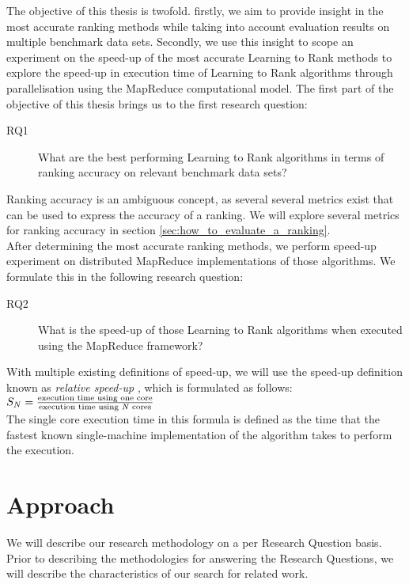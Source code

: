 The objective of this thesis is twofold. firstly, we aim to provide insight in the most accurate ranking methods while taking into account evaluation results on multiple benchmark data sets. Secondly, we use this insight to scope an experiment on the speed-up of the most accurate Learning to Rank methods to explore the speed-up in execution time of Learning to Rank algorithms through parallelisation using the MapReduce computational model. The first part of the objective of this thesis brings us to the first research question: \\

\begin{description}
\item[RQ1] What are the best performing Learning to Rank algorithms in terms of ranking accuracy on relevant benchmark data sets?
\end{description}
\bigskip
Ranking accuracy is an ambiguous concept, as several several metrics exist that can be used to express the accuracy of a ranking. We will explore several metrics for ranking accuracy in section \ref{sec:how_to_evaluate_a_ranking}.\\

After determining the most accurate ranking methods, we perform speed-up experiment on distributed MapReduce implementations of those algorithms. We formulate this in the following research question: \\

\begin{description}
\item[RQ2] What is the speed-up of those Learning to Rank algorithms when executed using the MapReduce framework?
\end{description}
\bigskip
With multiple existing definitions of speed-up, we will use the speed-up definition known as \emph{relative speed-up} \cite{Sun1991}, which is formulated as follows:\\

$S_N = \frac{\text{execution time using one core}}{\text{execution time using \emph{N} cores}}$\\

The single core execution time in this formula is defined as the time that the fastest known single-machine implementation of the algorithm takes to perform the execution.

\section{Approach}
We will describe our research methodology on a per Research Question basis. Prior to describing the methodologies for answering the Research Questions, we will describe the characteristics of our search for related work.

